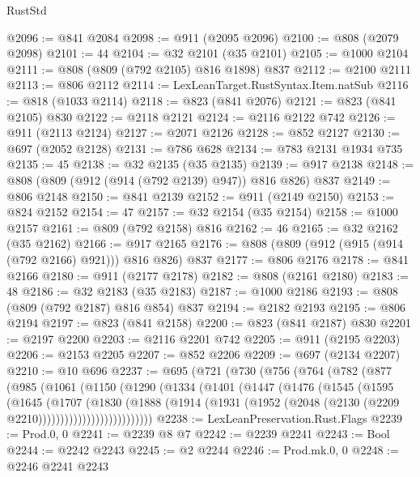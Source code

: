 \begin{lexlean}{RustStd}
\begin{coremodule}
@2096 := @841 @2084
@2098 := @911 (@2095 @2096)
@2100 := @808 (@2079 @2098)
@2101 := 44
@2104 := @32 @2101 (@35 @2101)
@2105 := @1000 @2104
@2111 := @808 (@809 (@792 @2105) @816 @1898) @837
@2112 := @2100 @2111
@2113 := @806 @2112
@2114 := LexLeanTarget.RustSyntax.Item.natSub
@2116 := @818 (@1033 @2114)
@2118 := @823 (@841 @2076)
@2121 := @823 (@841 @2105) @830
@2122 := @2118 @2121
@2124 := @2116 @2122 @742
@2126 := @911 (@2113 @2124)
@2127 := @2071 @2126
@2128 := @852 @2127
@2130 := @697 (@2052 @2128)
@2131 := @786 @628
@2134 := @783 @2131 @1934 @735
@2135 := 45
@2138 := @32 @2135 (@35 @2135)
@2139 := @917 @2138
@2148 := @808 (@809 (@912 (@914 (@792 @2139) @947)) @816 @826) @837
@2149 := @806 @2148
@2150 := @841 @2139
@2152 := @911 (@2149 @2150)
@2153 := @824 @2152
@2154 := 47
@2157 := @32 @2154 (@35 @2154)
@2158 := @1000 @2157
@2161 := @809 (@792 @2158) @816
@2162 := 46
@2165 := @32 @2162 (@35 @2162)
@2166 := @917 @2165
@2176 := @808 (@809 (@912 (@915 (@914 (@792 @2166) @921))) @816 @826) @837
@2177 := @806 @2176
@2178 := @841 @2166
@2180 := @911 (@2177 @2178)
@2182 := @808 (@2161 @2180)
@2183 := 48
@2186 := @32 @2183 (@35 @2183)
@2187 := @1000 @2186
@2193 := @808 (@809 (@792 @2187) @816 @854) @837
@2194 := @2182 @2193
@2195 := @806 @2194
@2197 := @823 (@841 @2158)
@2200 := @823 (@841 @2187) @830
@2201 := @2197 @2200
@2203 := @2116 @2201 @742
@2205 := @911 (@2195 @2203)
@2206 := @2153 @2205
@2207 := @852 @2206
@2209 := @697 (@2134 @2207)
@2210 := @10 @696
@2237 := @695
    (@721
      (@730
        (@756
          (@764
            (@782
              (@877
                (@985
                  (@1061
                    (@1150
                      (@1290
                        (@1334
                          (@1401
                            (@1447
                              (@1476
                                (@1545
                                  (@1595
                                    (@1645
                                      (@1707
                                        (@1830
                                          (@1888
                                            (@1914
                                              (@1931
                                                (@1952
                                                  (@2048
                                                    (@2130 (@2209 @2210))))))))))))))))))))))))))
@2238 := LexLeanPreservation.Rust.Flags
@2239 := Prod.{0, 0}
@2241 := @2239 @8 @7
@2242 := @2239 @2241
@2243 := Bool
@2244 := @2242 @2243
@2245 := @2 @2244
@2246 := Prod.mk.{0, 0}
@2248 := @2246 @2241 @2243

\end{coremodule}
\end{lexlean}
